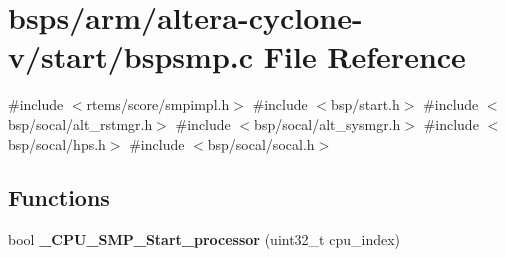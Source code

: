 \hypertarget{arm_2altera-cyclone-v_2start_2bspsmp_8c}{}\section{bsps/arm/altera-\/cyclone-\/v/start/bspsmp.c File Reference}
\label{arm_2altera-cyclone-v_2start_2bspsmp_8c}
{\ttfamily \#include $<$rtems/score/smpimpl.\+h$>$}\newline
{\ttfamily \#include $<$bsp/start.\+h$>$}\newline
{\ttfamily \#include $<$bsp/socal/alt\+\_\+rstmgr.\+h$>$}\newline
{\ttfamily \#include $<$bsp/socal/alt\+\_\+sysmgr.\+h$>$}\newline
{\ttfamily \#include $<$bsp/socal/hps.\+h$>$}\newline
{\ttfamily \#include $<$bsp/socal/socal.\+h$>$}\newline
\subsection*{Functions}
\begin{DoxyCompactItemize}
\item 
\mbox{\label{arm_2altera-cyclone-v_2start_2bspsmp_8c_a82297a5939469e63dfe6f7fdd390d22a}} 
bool {\bfseries \+\_\+\+C\+P\+U\+\_\+\+S\+M\+P\+\_\+\+Start\+\_\+processor} (uint32\+\_\+t cpu\+\_\+index)
\end{DoxyCompactItemize}

